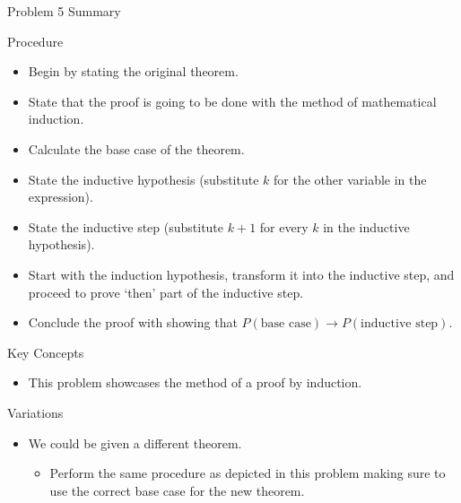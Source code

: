 \begin{summary}{Problem 5 Summary}
    \begin{statement}{Procedure}
        \begin{itemize}
            \item Begin by stating the original theorem.
            \item State that the proof is going to be done with the method of mathematical induction.
            \item Calculate the base case of the theorem.
            \item State the inductive hypothesis (substitute $k$ for the other variable in the expression).
            \item State the inductive step (substitute $k + 1$ for every $k$ in the inductive hypothesis).
            \item Start with the induction hypothesis, transform it into the inductive step, and proceed to prove `then' part of the inductive step.
            \item Conclude the proof with showing that $P(\text{base case}) \rightarrow P(\text{inductive step})$.
        \end{itemize}
    \end{statement}
    \begin{statement}{Key Concepts}
        \begin{itemize}
            \item This problem showcases the method of a proof by induction.
        \end{itemize}
    \end{statement}
    \begin{statement}{Variations}
        \begin{itemize}
            \item We could be given a different theorem.
            \begin{itemize}
                \item Perform the same procedure as depicted in this problem making sure to use the correct base case for the new theorem.
            \end{itemize}
        \end{itemize}
    \end{statement}
\end{summary}


